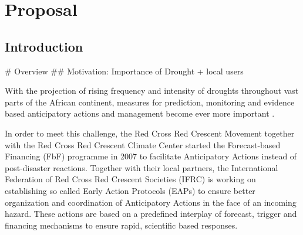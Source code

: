 
\chapter{Proposal} %

\label{Proposal} %

\newcommand{\keyword}[1]{\textbf{\#1}}
\newcommand{\tabhead}[1]{\textbf{\#1}}
\newcommand{\code}[1]{\texttt{\#1}}
\newcommand{\file}[1]{\texttt{\bfseries\#1}}
\newcommand{\option}[1]{\texttt{\itshape\#1}}


\section{Introduction}
\# Overview
\#\# Motivation: Importance of Drought + local users

With the projection of rising frequency and intensity of droughts throughout vast parts of the African continent, measures for prediction, monitoring and evidence based anticipatory actions and management become ever more important \autocite{abdulkadirAssessmentDroughtRecurrence2017,adelekanAfricaClimateChange2022,vereintenationenSpecialReportDrought2021}.

In order to meet this challenge, the Red Cross Red Crescent Movement together with the Red Cross Red Crescent Climate Center started the Forecast-based Financing (FbF) programme in 2007 to facilitate Anticipatory Actions instead of post-disaster reactions. Together with their local partners, the International Federation of Red Cross Red Crescent Societies (IFRC) is working on establishing so called Early Action Protocols (EAPs) to ensure better organization and coordination of Anticipatory Actions in the face of an incoming hazard. These actions are based on a predefined interplay of forecast, trigger and financing mechanisms to ensure rapid, scientific based responses.

